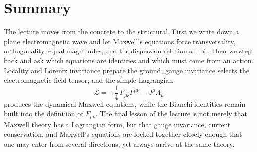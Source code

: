 \section{Summary}

The lecture moves from the concrete to the structural. First we write down a plane electromagnetic wave and let Maxwell's equations force transversality, orthogonality, equal magnitudes, and the dispersion relation \(\omega=k\). Then we step back and ask which equations are identities and which must come from an action. Locality and Lorentz invariance prepare the ground; gauge invariance selects the electromagnetic field tensor; and the simple Lagrangian
\begin{equation}
\mathcal L
=
-\frac14\,F_{\mu\nu}F^{\mu\nu}
-
J^\mu A_\mu
\end{equation}
produces the dynamical Maxwell equations, while the Bianchi identities remain built into the definition of \(F_{\mu\nu}\). The final lesson of the lecture is not merely that Maxwell theory has a Lagrangian form, but that gauge invariance, current conservation, and Maxwell's equations are locked together closely enough that one may enter from several directions, yet always arrive at the same theory.